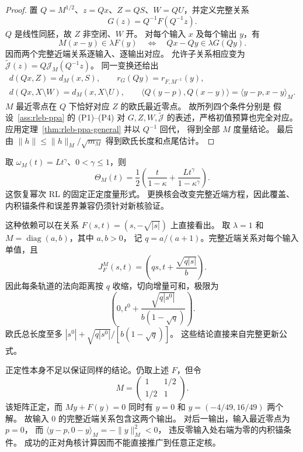 \begin{proof}
置 $Q=M^{1/2}$、$z=Qx$、$Z=QS$、$W=QU$，并定义完整关系
\[
 G(z)=Q^{-1}F(Q^{-1}z).
\]
$Q$ 是线性同胚，故 $Z$ 非空闭、$W$ 开。
对每个输入 $x$ 及每个输出 $y$，有
\[
 M(x-y)\in\lambda F(y)
 \quad\Longleftrightarrow\quad
 Qx-Qy\in\lambda G(Qy).
\]
因而两个完整近端关系逐输入、逐输出对应。
允许子关系相应变为
$\widetilde{\mathcal J}(z)=Q\mathcal J_M(Q^{-1}z)$。
同一变换还给出
\[
 \begin{gathered}
 d(Qx,Z)=d_M(x,S),\qquad
 r_G(Qy)=r_{F,M^{-1}}(y),\\
 d(Qx,X\setminus W)=d_M(x,X\setminus U),\qquad
 \langle Q(y-p),Q(x-y)\rangle=\langle y-p,x-y\rangle_M.
 \end{gathered}
\]
$M$ 最近零点在 $Q$ 下恰好对应 $Z$ 的欧氏最近零点。
故所列四个条件分别是
假设~\ref{ass:rleb-ppa} 的 (P1)--(P4) 对
$G,Z,W,\widetilde{\mathcal J}$ 的表述，严格初值预算也完全对应。
应用定理~\ref{thm:rleb-ppa-general} 并以 $Q^{-1}$ 回代，
得到全部 $M$ 度量结论。
最后由 $\|h\|\le\|h\|_M/\sqrt{m_M}$ 得到欧氏长度和点尾估计。
\end{proof}

\begin{remark}[幂次模与核的重新验证]
取 $\omega_M(t)=Lt^\gamma$、$0<\gamma\le1$，则
\[
 \Theta_M(t)=\frac12\left(
 \frac{t}{1-\kappa}+\frac{Lt^\gamma}{1-\kappa^\gamma}\right).
\]
这恢复幂次 RL 的固定正定度量形式。
更换核会改变完整近端方程，因此覆盖、内积锚条件和误差界兼容仍须针对新核验证。
\end{remark}

这种依赖可以在关系 $F(s,t)=(s,-\sqrt{|s|})$ 上直接看出。
取 $\lambda=1$ 和 $M=\operatorname{diag}(a,b)$，其中 $a,b>0$，
记 $q=a/(a+1)$。完整近端关系对每个输入单值，且
\[
 J^M_F(s,t)=\left(qs,t+\frac{\sqrt{q|s|}}b\right).
\]
因此每条轨道的法向距离按 $q$ 收缩，切向增量可和，极限为
\[
 \left(0,t^0+\frac{\sqrt{q|s^0|}}{b(1-\sqrt q)}\right).
\]
欧氏总长度至多 $|s^0|+\sqrt{q|s^0|}/[b(1-\sqrt q)]$。
这些结论直接来自完整更新公式。

正定性本身不足以保证同样的结论。仍取上述 $F$，但令
\[
 M=\begin{pmatrix}1&1/2\\1/2&1\end{pmatrix}.
\]
该矩阵正定，而 $M y+F(y)=0$ 同时有
$y=0$ 和 $y=(-4/49,16/49)$ 两个解。
故输入 $0$ 的完整近端关系包含这两个输出。
对后一输出，输入最近零点为 $p=0$，
而 $\langle y-p,0-y\rangle_M=-\|y\|_M^2<0$，
违反零输入处右端为零的内积锚条件。
成功的正对角核计算因而不能直接推广到任意正定核。
